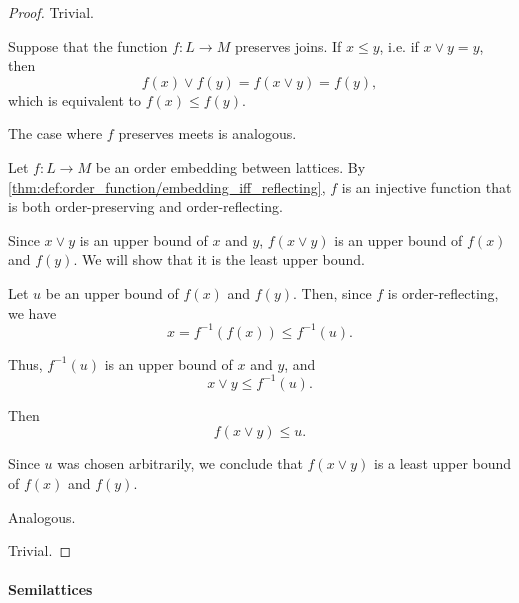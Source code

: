\begin{proof}
   Trivial.

   Suppose that the function \( f: L \to M \) preserves joins. If \( x \leq y \), i.e. if \( x \vee y = y \), then
  \begin{equation*}
    f(x) \vee f(y) = f(x \vee y) = f(y),
  \end{equation*}
  which is equivalent to \( f(x) \leq f(y) \).

  The case where \( f \) preserves meets is analogous.

   Let \( f: L \to M \) be an order embedding between lattices. By \cref{thm:def:order_function/embedding_iff_reflecting}, \( f \) is an injective function that is both order-preserving and order-reflecting.

   Since \( x \vee y \) is an upper bound of \( x \) and \( y \), \( f(x \vee y) \) is an upper bound of \( f(x) \) and \( f(y) \). We will show that it is the least upper bound.

  Let \( u \) be an upper bound of \( f(x) \) and \( f(y) \). Then, since \( f \) is order-reflecting, we have
  \begin{equation*}
    x = f^{-1}(f(x)) \leq f^{-1}(u).
  \end{equation*}

  Thus, \( f^{-1}(u) \) is an upper bound of \( x \) and \( y \), and
  \begin{equation*}
    x \vee y \leq f^{-1}(u).
  \end{equation*}

  Then
  \begin{equation*}
    f(x \vee y) \leq u.
  \end{equation*}

  Since \( u \) was chosen arbitrarily, we conclude that \( f(x \vee y) \) is a least upper bound of \( f(x) \) and \( f(y) \).

   Analogous.

   Trivial.
\end{proof}

\paragraph{Semilattices}

